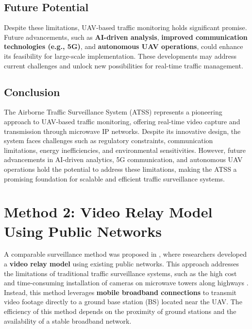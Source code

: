 \subsection{Future Potential}
Despite these limitations, UAV-based traffic monitoring holds significant promise. Future advancements, such as \textbf{AI-driven analysis}, \textbf{improved communication technologies (e.g., 5G)}, and \textbf{autonomous UAV operations}, could enhance its feasibility for large-scale implementation. These developments may address current challenges and unlock new possibilities for real-time traffic management.

\subsection{Conclusion}
The Airborne Traffic Surveillance System (ATSS) represents a pioneering approach to UAV-based traffic monitoring, offering real-time video capture and transmission through microwave IP networks. Despite its innovative design, the system faces challenges such as regulatory constraints, communication limitations, energy inefficiencies, and environmental sensitivities. However, future advancements in AI-driven analytics, 5G communication, and autonomous UAV operations hold the potential to address these limitations, making the ATSS a promising foundation for scalable and efficient traffic surveillance systems.


\section{Method 2: Video Relay Model Using Public Networks}
\label{sec:method2}

A comparable surveillance method was proposed in \cite{chen2007realtime}, where researchers developed a \textbf{video relay model} using existing public networks. This approach addresses the limitations of traditional traffic surveillance systems, such as the high cost and time-consuming installation of cameras on microwave towers along highways \cite{srinivasan2004atss}. Instead, this method leverages \textbf{mobile broadband connections} to transmit video footage directly to a ground base station (BS) located near the UAV. The efficiency of this method depends on the proximity of ground stations and the availability of a stable broadband network.

\vspace{\baselineskip} %

